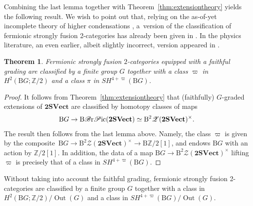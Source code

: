 \documentclass[10pt,a4paper]{amsart}
\newtheorem{Theorem}{Theorem}[section]
\numberwithin{equation}{section}
\begin{document}
Combining the last lemma together with Theorem~\ref{thm:extensiontheory} yields the following result. We wish to point out that, relying on the as-of-yet incomplete theory of higher condensations \cite{GJF}, a~version of the classification of fermionic strongly fusion 2-categories has already been given in \cite[Section~V.D]{JF}. In the physics literature, an even earlier, albeit slightly incorrect, version appeared in \cite{LW}.


\begin{Theorem}\label{thm:classificationFSF2Cs}
Fermionic strongly fusion $2$-categories equipped with a faithful grading are classified by a finite group $G$ together with a class $\varpi$ in $H^2(\mathrm{B}G;\mathbb{Z}/2)$ and a class $\pi$ in $SH^{4+\varpi}(\mathrm{B}G)$.
\end{Theorem}

\begin{proof}
It follows from Theorem~\ref{thm:extensiontheory} that (faithfully) $G$-graded extensions of $\mathbf{2SVect}$ are classified by homotopy classes of maps
 \begin{gather*}
\mathrm{B}G\rightarrow \mathrm{B}\mathscr{B}{\rm r}\mathscr{P}{\rm ic}(\mathbf{2SVect})\simeq\mathrm{B}^2\mathscr{Z}(\mathbf{2SVect})^{\times}.
\end{gather*}
 The result then follows from the last lemma above. Namely, the class $\varpi$ is given by the composite~$\mathrm{B}G\rightarrow \mathrm{B}^2\mathscr{Z}(\mathbf{2SVect})^{\times}\rightarrow \mathrm{B}\mathbb{Z}/2[1]$, and endows $\mathrm{B}G$ with an action by $\mathbb{Z}/2[1]$. In addition, the data of a map $\mathrm{B}G\rightarrow \mathrm{B}^2\mathscr{Z}(\mathbf{2SVect})^{\times}$ lifting $\varpi$ is precisely that of a class in $SH^{4+\varpi}(\mathrm{B}G)$.
\end{proof}


\begin{Remark}
Without taking into account the faithful grading, fermionic strongly fusion 2-categories are classified by a finite group $G$ together with a class in $H^2(\mathrm{B}G;\mathbb{Z}/2)/\operatorname{Out}(G)$ and a class in $SH^{4+\varpi}(\mathrm{B}G)/\operatorname{Out}(G)$.
\end{Remark}
\end{document}
